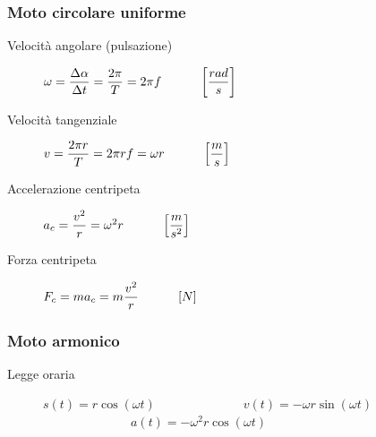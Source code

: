 \documentclass[a4paper,11pt,italian]{article}
\begin{document}
\subsubsection{Moto circolare uniforme}
\begin{description}
%   
  
  \item[Velocità angolare (pulsazione)] 
  $ \omega = \dfrac{\Delta\alpha}{\Delta t} = \dfrac{2 \pi}{T} = 2 \pi f \hspace*{3em} \left[ \dfrac{rad}{s} \right] $
  
  \item[Velocità tangenziale] 
  $ v = \dfrac{2 \pi r}{T} = 2\pi r f = \omega r  \hspace*{3em} \left[ \dfrac{m}{s} \right]$
  
  \item[Accelerazione centripeta] 
  $ a_c = \dfrac{v^2}{r} = \omega^2 r \hspace*{3em} \left[ \dfrac{m}{s^2} \right] $
  
  \item[Forza centripeta] 
  $ F_c = m  a_c = m  \dfrac{v^2}{r} \hspace*{3em} \left[ N \right] $
\end{description}

\subsubsection{Moto armonico}
\begin{description}
  \item[Legge oraria]  $ s(t) = r \cos(\omega t) $~~~~~~~~~~~~~~$ v(t) = - \omega r  \sin(\omega t) $~~~~~~~~~~~~~~$ a(t) = - \omega^2 r  \cos(\omega t) $
\end{description}
\end{document}
